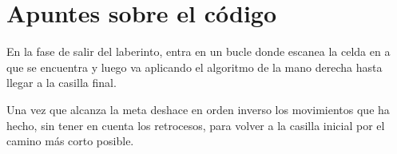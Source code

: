 \section{Apuntes sobre el código}
En la fase de salir del laberinto, entra en un bucle donde escanea la celda en a que se encuentra y luego va aplicando el algoritmo de la mano derecha hasta llegar a la casilla final.

Una vez que alcanza la meta deshace en orden inverso los movimientos que ha hecho, sin tener en cuenta los retrocesos, para volver a la casilla inicial por el camino más corto posible.